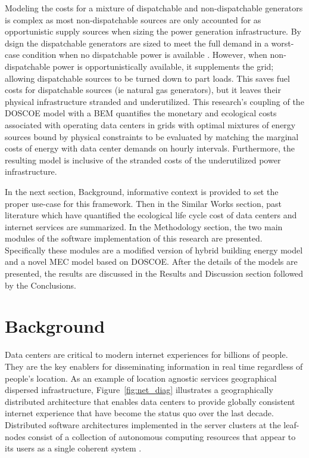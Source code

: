 Modeling the costs for a mixture of dispatchable and non-dispatchable generators is complex as most non-dispatchable sources are only accounted for as opportunistic supply sources when sizing the power generation infrastructure. By dsign the dispatchable generators are sized to meet the full demand in a worst-case condition when no dispatchable power is available \citep{platt17}. However, when non-dispatchable power is opportunistically available, it supplements the grid; allowing dispatchable sources to be turned down to part loads. This saves fuel costs for dispatchable sources (ie natural gas generators), but it leaves their physical infrastructure stranded and underutilized. This research’s coupling of the DOSCOE model with a BEM quantifies the monetary and ecological costs associated with operating data centers in grids with optimal mixtures of energy sources bound by physical constraints to be evaluated by matching the marginal costs of energy with data center demands on hourly intervals. Furthermore, the resulting model is inclusive of the stranded costs of the underutilized power infrastructure.

In the next section, Background, informative context is provided to set the proper use-case for this framework. Then in the Similar Works section, past literature which have quantified the ecological life cycle cost of data centers and internet services are summarized. In the Methodology section, the two main modules of the software implementation of this research are presented. Specifically these modules are a modified version of hybrid building energy model and a novel MEC model based on DOSCOE. After the details of the models are presented, the results are discussed in the Results and Discussion section followed by the Conclusions.


\section{Background}
Data centers are critical to modern internet experiences for billions of people. They are the key enablers for disseminating information in real time regardless of people's location. As an example of location agnostic services geographical dispersed infrastructure, Figure~\ref{fig:net_diag} illustrates a geographically distributed architecture that enables data centers to provide globally consistent internet experience that have become the status quo over the last decade. Distributed software architectures implemented in the server clusters at the leaf-nodes consist of a collection of autonomous computing resources that appear to its users as a single coherent system \citep{tanenbaum}.

